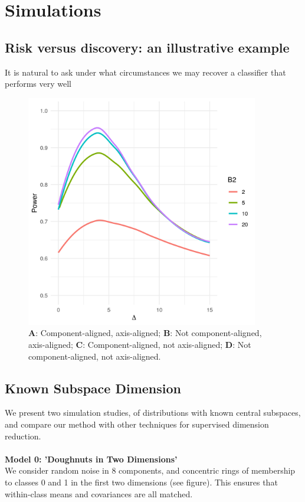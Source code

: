 \documentclass[12pt]{article}
\begin{document}
\section{Simulations}
\subsection{Risk versus discovery: an illustrative example}
It is natural to ask under what circumstances we may recover a classifier that performs very well

\begin{figure}[htbp]
    \centering
    \includegraphics[width=4in]{../results/figures/ChangingDelta.png}
    \caption{\textbf{A}: Component-aligned, axis-aligned; \textbf{B}: Not component-aligned, axis-aligned; \textbf{C}: Component-aligned, not axis-aligned; \textbf{D}: Not component-aligned, not axis-aligned.\label{fig:examplefigures}}
\end{figure}

\subsection{Known Subspace Dimension}

We present two simulation studies, of distributions with known central subspaces, and compare our method with other techniques for supervised dimension reduction. \\
~\\
\textbf{Model 0: 'Doughnuts in Two Dimensions'} \\
We consider random noise in 8 components, and concentric rings of membership to classes 0 and 1 in the first two dimensions (see figure). This ensures that within-class means and covariances are all matched. \\
\end{document}
